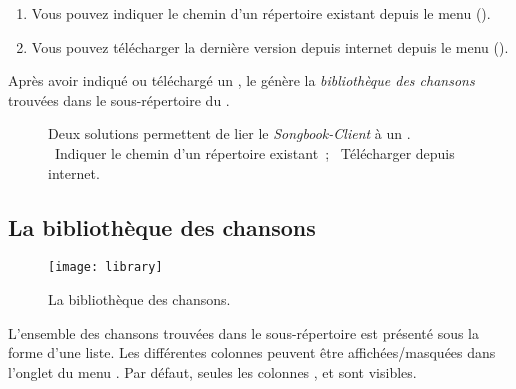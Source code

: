 \begin{enumerate}
\item Vous pouvez indiquer le chemin d'un répertoire
   existant depuis le menu
   ().
\item Vous pouvez télécharger la dernière version depuis internet
  depuis le menu 
  ().
\end{enumerate}

Après avoir indiqué ou téléchargé un \recueil{}, le \client{} génère la
\emph{bibliothèque des chansons} trouvées dans le sous-répertoire
 du \recueil{}.


\begin{figure}
  \centering
  \hspace{0.1cm}%
  \caption{%
    Deux solutions permettent de lier le \emph{Songbook-Client} à un \recueil{}.
    ~Indiquer le chemin d'un répertoire existant~;%
    ~Télécharger depuis internet.%
  }%
  \label{fig:solutions}
\end{figure}


\subsection{La bibliothèque des chansons}

\begin{figure}
  \centering
  \texttt{[image: library]}
  \caption{La bibliothèque des chansons.}
  \label{fig:library}
\end{figure}

L'ensemble des chansons  trouvées dans le sous-répertoire
 est présenté sous la forme d'une liste. Les
différentes colonnes peuvent être affichées/masquées dans l'onglet
 du menu . Par défaut,
seules les colonnes ,  et
 sont visibles.

